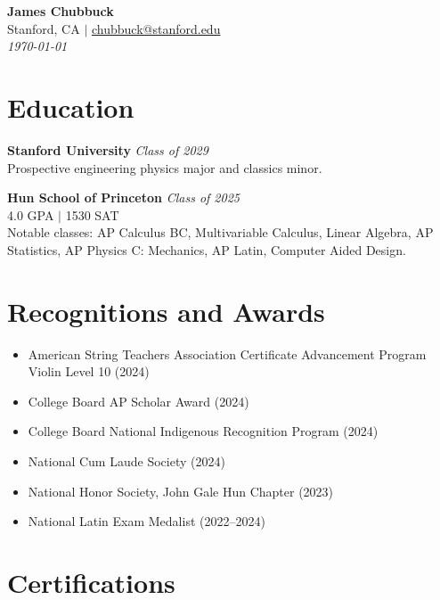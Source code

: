 \documentclass[11pt]{article}
\begin{document}
\pagestyle{empty} 

\begin{center}
    {\Huge \textbf{James Chubbuck}} \\[1.5ex]
    Stanford, CA $\vert$ \href{mailto:chubbuck@stanford.edu}{chubbuck@stanford.edu} \\[1ex]
    \textit{\today}
\end{center}

\vspace{2ex}

\section*{Education}

\textbf{Stanford University} \hfill \textit{Class of 2029} \\
Prospective engineering physics major and classics minor. 

\vspace{1.5ex}

\textbf{Hun School of Princeton} \hfill \textit{Class of 2025} \\
4.0 GPA $\vert$ 1530 SAT \\
Notable classes: AP Calculus BC, Multivariable Calculus, Linear Algebra, AP Statistics, AP Physics C: Mechanics, AP Latin, Computer Aided Design.

\section*{Recognitions and Awards}
\begin{itemize}[leftmargin=*, nosep, itemsep=0.3ex]
  \item American String Teachers Association Certificate Advancement Program Violin Level 10 (2024)
  \item College Board AP Scholar Award (2024)
  \item College Board National Indigenous Recognition Program (2024)
  \item National Cum Laude Society (2024)
  \item National Honor Society, John Gale Hun Chapter (2023)
  \item National Latin Exam Medalist (2022--2024)
\end{itemize}

\section*{Certifications}
\end{document}
